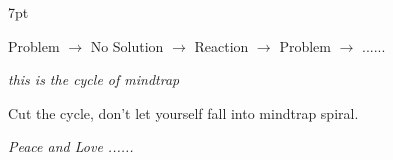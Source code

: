 \documentclass[a6paper,9pt,landscape]{texMemo} %
\newenvironment{formal}{%
  \def\FrameCommand{%
    \hspace{1pt}%
    {\color{mypink3}\vrule width 6pt}%
    {\color{formalshade}\vrule width 4pt}%
    \colorbox{formalshade}%
  }%
  \MakeFramed{\advance\hsize-\width\FrameRestore}%
  \noindent\hspace{-4.55pt}%
  \begin{adjustwidth}{}{7pt}%
  \vspace{2pt}\vspace{2pt}%
}
{%
  \vspace{2pt}\end{adjustwidth}\endMakeFramed%
}
\begin{document}
\maketitle %
\thispagestyle{empty} %
 
\begin{formal}
Problem $\rightarrow$ No Solution $\rightarrow$   Reaction $\rightarrow$  Problem  $\rightarrow$   ......
\end{formal}
\begin{flushright}
\textit{this is the cycle of mindtrap} 
\end{flushright}

\indent Cut the cycle, don't let yourself fall into mindtrap spiral.

\textit{Peace and Love ......}
\end{document}
